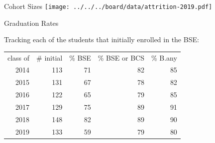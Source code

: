 \documentclass{beamer}
\newenvironment{changemargin}[1]{%
  \begin{list}{}{%
    \setlength{\topsep}{0pt}%
    \setlength{\leftmargin}{#1}%
    \setlength{\rightmargin}{1em}
    \setlength{\listparindent}{\parindent}%
    \setlength{\itemindent}{\parindent}%
    \setlength{\parsep}{\parskip}%
  }%
  \item[]}{\end{list}}
\begin{document}



\begin{frame}{Cohort Sizes}
  \texttt{[image: ../../../board/data/attrition-2019.pdf]}
  
\end{frame}

\begin{frame}{Graduation Rates}
  \begin{center}
    Tracking each of the students that initially enrolled in the BSE:\\[1em]
  \begin{tabular}{rrrrr}
  class of  &\# initial & \% BSE & \% BSE or BCS & \% B.any \\
  2014 & 113 & 71 & 82 & 85 \\
  2015 & 131 & 67 & 78 & 82 \\
  2016 & 122 & 65 & 79 & 85 \\
  2017 & 129 & 75 & 89 & 91 \\
  2018 & 148 & 82 & 89 & 90 \\
  2019 & 133 & 59 & 79 & 80 \\
  \end{tabular}
  ~\\[1em]
  \end{center}
\end{frame}
\end{document}
